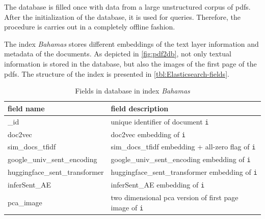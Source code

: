 The database is filled once with data from a large unstructured corpus of \acp{pdf}.
After the initialization of the database, it is used for queries. 
Therefore, the procedure is carries out in a completely offline fashion.

The index \textit{Bahamas} stores different embeddings of the text layer information and metadata of the documents.
As depicted in \autoref{fig:pdf2db}, not only textual information is stored in the database, but also the images of the first page of the \acp{pdf}.
The structure of the index is presented in \autoref{tbl:Elasticsearch-fields}.

\begin{table}[]
    \caption{Fields in \databaseName{} database in index \textit{Bahamas}}
    \begin{tabular}{|
    >{\columncolor[HTML]{EFEFEF}}l |p{}|}
    \hline
    \cellcolor[HTML]{C0C0C0}\textbf{field name} & \cellcolor[HTML]{C0C0C0}\textbf{field description}                                       \\ \hline
    \_id                                        & unique identifier of document \texttt{i}                                                 \\ \hline
    doc2vec                                     & doc2vec embedding of \texttt{i}                                                          \\ \hline
    sim\_docs\_tfidf                            & sim\_docs\_tfidf embedding + all-zero flag of \texttt{i}                                 \\ \hline
    google\_univ\_sent\_encoding                & google\_univ\_sent\_encoding embedding of \texttt{i}                                     \\ \hline
    huggingface\_sent\_transformer              & huggingface\_sent\_transformer embedding of \texttt{i}                                   \\ \hline
    inferSent\_AE                               & inferSent\_AE embedding of \texttt{i}                                                    \\ \hline
    pca\_image                                  & two dimensional \ac{pca} version of first page image of \texttt{i}                      \\ \hline

\end{tabular}
\end{table}

